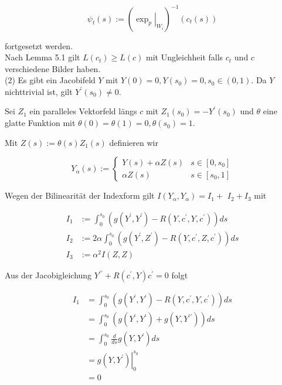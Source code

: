 \documentclass[10pt, letterpaper]{article}
\begin{document}
$$
\psi_{t}(s):=\left(\left.\exp _{p}\right|_{W_{i}}\right)^{-1}\left(c_{t}(s)\right)
$$

fortgesetzt werden.\\
Nach Lemma 5.1 gilt $L\left(c_{t}\right) \geq L(c)$ mit Ungleichheit falls $c_{t}$ und $c$ verschiedene Bilder haben.\\
(2) Es gibt ein Jacobifeld $Y$ mit $Y(0)=0, Y\left(s_{0}\right)=0, s_{0} \in(0,1)$. Da $Y$ nichttrivial ist, gilt $Y^{\prime}\left(s_{0}\right) \neq 0$.

Sei $Z_{1}$ ein paralleles Vektorfeld längs $c$ mit $Z_{1}\left(s_{0}\right)=-Y^{\prime}\left(s_{0}\right)$ und $\theta$ eine glatte Funktion mit $\theta(0)=\theta(1)=0, \theta\left(s_{0}\right)=1$.

Mit $Z(s):=\theta(s) Z_{1}(s)$ definieren wir

$$
Y_{\alpha}(s):=\left\{\begin{array}{cl}
Y(s)+\alpha Z(s) & s \in\left[0, s_{0}\right] \\
\alpha Z(s) & s \in\left[s_{0}, 1\right]
\end{array}\right.
$$

Wegen der Bilinearität der Indexform gilt $I\left(Y_{\alpha}, Y_{\alpha}\right)=I_{1}+$ $I_{2}+I_{3}$ mit

$$
\begin{aligned}
I_{1} & :=\int_{0}^{s_{0}}\left(g\left(Y^{\prime}, Y^{\prime}\right)-R\left(Y, c^{\prime}, Y, c^{\prime}\right)\right) d s \\
I_{2} & :=2 \alpha \int_{0}^{s_{0}}\left(g\left(Y^{\prime}, Z^{\prime}\right)-R\left(Y, c^{\prime}, Z, c^{\prime}\right)\right) d s \\
I_{3} & :=\alpha^{2} I(Z, Z)
\end{aligned}
$$

Aus der Jacobigleichung $Y^{\prime \prime}+R\left(c^{\prime}, Y\right) c^{\prime}=0$ folgt

$$
\begin{aligned}
I_{1} & =\int_{0}^{s_{0}}\left(g\left(Y^{\prime}, Y^{\prime}\right)-R\left(Y, c^{\prime}, Y, c^{\prime}\right)\right) d s \\
& =\int_{0}^{s_{0}}\left(g\left(Y^{\prime}, Y^{\prime}\right)+g\left(Y, Y^{\prime \prime}\right)\right) d s \\
& =\int_{0}^{s_{0}} \frac{d}{d s} g\left(Y, Y^{\prime}\right) d s \\
& =\left.g\left(Y, Y^{\prime}\right)\right|_{0} ^{s_{0}} \\
& =0
\end{aligned}
$$
\end{document}
